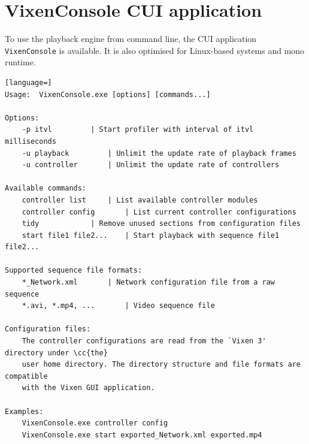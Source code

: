 \section{VixenConsole CUI application}

To use the playback engine from command line, the CUI application \texttt{VixenConsole} is available. It is also optimised for Linux-based systems and  mono runtime.

\newpage

\renewcommand{\baselinestretch}{1}
\begin{lstlisting}[language=]
Usage:  VixenConsole.exe [options] [commands...]

Options:
    -p itvl			| Start profiler with interval of itvl milliseconds
    -u playback			| Unlimit the update rate of playback frames
    -u controller		| Unlimit the update rate of controllers

Available commands:
    controller list		| List available controller modules
    controller config		| List current controller configurations
    tidy			| Remove unused sections from configuration files
    start file1 file2...	| Start playback with sequence file1 file2...

Supported sequence file formats:
    *_Network.xml		| Network configuration file from a raw sequence
    *.avi, *.mp4, ...		| Video sequence file

Configuration files:
    The controller configurations are read from the `Vixen 3' directory under \cc{the}
    user home directory. The directory structure and file formats are compatible
    with the Vixen GUI application.

Examples:
    VixenConsole.exe controller config
    VixenConsole.exe start exported_Network.xml exported.mp4
\end{lstlisting}
\renewcommand{\baselinestretch}{\mystretch}

